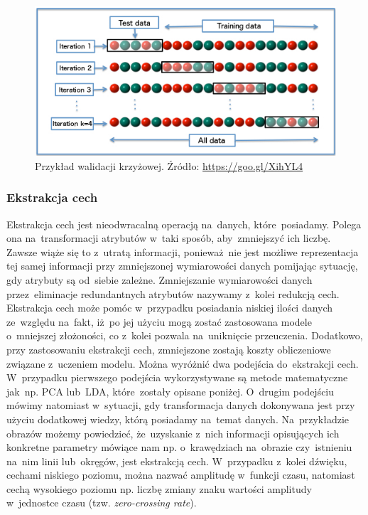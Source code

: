 \begin{figure}[ht!]
\centering
\includegraphics[scale=0.7]{res/cv.jpg}
\caption[Caption for LOF]{Przykład walidacji krzyżowej. Źródło: \url{https://goo.gl/XihYL4}} \label{cv} 
\end{figure}


\subsubsection{Ekstrakcja cech}
Ekstrakcja cech jest nieodwracalną operacją na~danych, które~posiadamy. Polega ona na~transformacji atrybutów w~taki sposób, aby~zmniejszyć ich liczbę. Zawsze wiąże się to z~utratą informacji, ponieważ~nie jest możliwe reprezentacja tej samej informacji przy zmniejszonej wymiarowości danych pomijając sytuację, gdy atrybuty są od~siebie zależne. Zmniejszanie wymiarowości danych przez~eliminacje redundantnych atrybutów nazywamy z~kolei redukcją cech.  Ekstrakcja cech może pomóc w~przypadku posiadania niskiej ilości danych ze~względu na~fakt, iż~po jej użyciu mogą zostać zastosowana modele o~mniejszej złożoności, co z~kolei pozwala na~uniknięcie przeuczenia. Dodatkowo, przy zastosowaniu ekstrakcji cech, zmniejszone zostają koszty obliczeniowe związane z~uczeniem modelu. Można wyróżnić dwa podejścia do~ekstrakcji cech. W~przypadku pierwszego podejścia wykorzystywane są metode matematyczne jak~np. PCA lub~LDA, które~zostały opisane poniżej. O~drugim podejściu mówimy natomiast w~sytuacji, gdy transformacja danych dokonywana jest przy użyciu dodatkowej wiedzy, którą posiadamy na~temat danych. Na~przykładzie obrazów możemy powiedzieć, że~uzyskanie z~nich informacji opisujących ich konkretne parametry mówiące nam np. o~krawędziach na~obrazie czy~istnieniu na~nim linii lub~okręgów, jest ekstrakcją cech. W~przypadku z~kolei dźwięku, cechami niskiego poziomu, można nazwać amplitudę w~funkcji czasu, natomiast cechą wysokiego poziomu np. liczbę zmiany znaku wartości amplitudy w~jednostce czasu (tzw. \textit{zero-crossing rate}).
